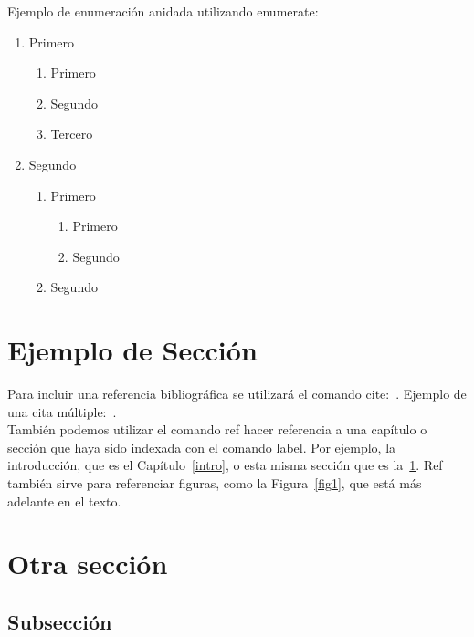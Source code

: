 \documentclass[12pt,a4paper,oneside]{book}
\begin{document}
Ejemplo de enumeración anidada utilizando enumerate:
\begin{enumerate}
    \item Primero 
        \begin{enumerate}
        \item Primero
        \item Segundo
        \item Tercero
        \end{enumerate}
    \item Segundo
        \begin{enumerate}
        \item Primero
            \begin{enumerate}
            \item Primero
            \item Segundo
            \end{enumerate}
        \item Segundo
        \end{enumerate}
\end{enumerate}



\section{Ejemplo de Sección}
\label{secc1}

Para incluir una referencia bibliográfica se utilizará el comando cite:~\cite{girard1989}.
Ejemplo de una cita múltiple:~\cite{ranta2012,tcs2015}.\\

También podemos utilizar el comando ref hacer referencia a una capítulo o sección que haya sido indexada con el comando label. Por ejemplo, la introducción, que es el Capítulo~\ref{intro}, o esta misma sección que es la~\ref{secc1}. Ref también sirve para referenciar figuras, como la Figura~\ref{fig1}, que está más adelante en el texto.



\section{Otra sección}

\lipsum[3]




\subsection{Subsección}
\end{document}
